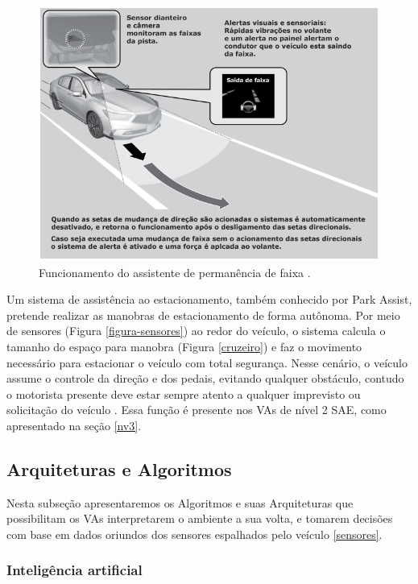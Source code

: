 \begin{figure}[H]
\centering
\includegraphics[width=\textwidth]{Figures/assistente.png}
\caption{Funcionamento do assistente de permanência de faixa \cite{caio}.}
\label{assistente}
\end{figure}

 \label{estacionamento}
Um sistema de assistência ao estacionamento, também conhecido por Park Assist, pretende realizar as manobras de estacionamento de forma autônoma. Por meio de sensores (Figura \ref{figura-sensores}) ao redor do veículo, o sistema calcula o tamanho do espaço para manobra (Figura \ref{cruzeiro}) e faz o movimento necessário para estacionar o veículo com total segurança. Nesse cenário, o veículo assume o controle da direção e dos pedais, evitando qualquer obstáculo, contudo o motorista presente deve estar sempre atento a qualquer imprevisto ou solicitação do veículo \cite{caio}. Essa função é presente nos VAs de nível 2 SAE, como apresentado na seção \ref{nv3}.
\subsection{Arquiteturas e Algoritmos} \label{arq_alg}

Nesta subseção apresentaremos os Algoritmos e suas Arquiteturas que possibilitam os VAs interpretarem o ambiente a sua volta, e tomarem decisões com base em dados oriundos dos sensores espalhados pelo veículo \ref{sensores}. 


\subsubsection{Inteligência artificial} \label{ia}

